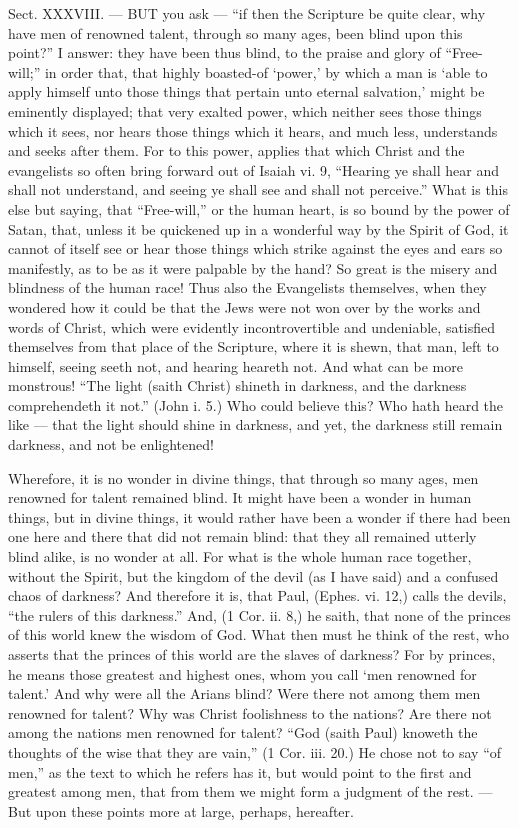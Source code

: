 Sect. XXXVIII. — BUT you ask — “if then the Scripture be quite clear, why have men of renowned talent, through so many ages, been blind upon this point?” I answer: they have been thus blind, to the praise and glory of “Free-will;” in order that, that highly boasted-of ‘power,’ by which a man is ‘able to apply himself unto those things that pertain unto eternal salvation,’ might be eminently displayed; that very exalted power, which neither sees those things which it sees, nor hears those things which it hears, and much less, understands and seeks after them. For to this power, applies that which Christ and the evangelists so often bring forward out of Isaiah vi. 9, “Hearing ye shall hear and shall not understand, and seeing ye shall see and shall not perceive.” What is this else but saying, that “Free-will,” or the human heart, is so bound by the power of Satan, that, unless it be quickened up in a wonderful way by the Spirit of God, it cannot of itself see or hear those things which strike against the eyes and ears so manifestly, as to be as it were palpable by the hand? So great is the misery and blindness of the human race! Thus also the Evangelists themselves, when they wondered how it could be that the Jews were not won over by the works and words of Christ, which were evidently incontrovertible and undeniable, satisfied themselves from that place of the Scripture, where it is shewn, that man, left to himself, seeing seeth not, and hearing heareth not. And what can be more monstrous! “The light (saith Christ) shineth in darkness, and the darkness comprehendeth it not.” (John i. 5.) Who could believe this? Who hath heard the like — that the light should shine in darkness, and yet, the darkness still remain darkness, and not be enlightened!

Wherefore, it is no wonder in divine things, that through so many ages, men renowned for talent remained blind. It might have been a wonder in human things, but in divine things, it would rather have been a wonder if there had been one here and there that did not remain blind: that they all remained utterly blind alike, is no wonder at all. For what is the whole human race together, without the Spirit, but the kingdom of the devil (as I have said) and a confused chaos of darkness? And therefore it is, that Paul, (Ephes. vi. 12,) calls the devils, “the rulers of this darkness.” And, (1 Cor. ii. 8,) he saith, that none of the princes of this world knew the wisdom of God. What then must he think of the rest, who asserts that the princes of this world are the slaves of darkness? For by princes, he means those greatest and highest ones, whom you call ‘men renowned for talent.’ And why were all the Arians blind? Were there not among them men renowned for talent? Why was Christ foolishness to the nations? Are there not among the nations men renowned for talent? “God (saith Paul) knoweth the thoughts of the wise that they are vain,” (1 Cor. iii. 20.) He chose not to say “of men,” as the text to which he refers has it, but would point to the first and greatest among men, that from them we might form a judgment of the rest. — But upon these points more at large, perhaps, hereafter.

